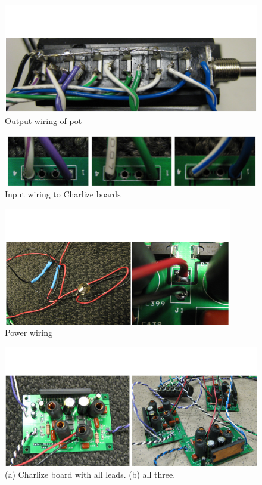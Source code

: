 \begin{figure}[t]
\centering
\includegraphics[width=\textwidth]{img-10-eps-converted-to-crop.pdf}
\caption{Output wiring of pot}
\label{Smallwood:img-10}
\end{figure}


\begin{figure}[t]
\centering
\includegraphics[width=\textwidth]{img-11-eps-converted-to-crop.pdf}
\caption{Input wiring to Charlize boards}
\label{Smallwood:img-11}
\end{figure}


\begin{figure}[t]
\centering
\includegraphics[width=\textwidth]{img-12-eps-converted-to-crop.pdf}
\caption{Power wiring}
\label{Smallwood:img-12}
\end{figure}


\begin{figure}[t]
\centering
\includegraphics[width=\textwidth]{img-13-eps-converted-to-crop.pdf}
\caption{(a) Charlize board with all leads. (b) all three.}
\label{Smallwood:img-13}
\end{figure}


